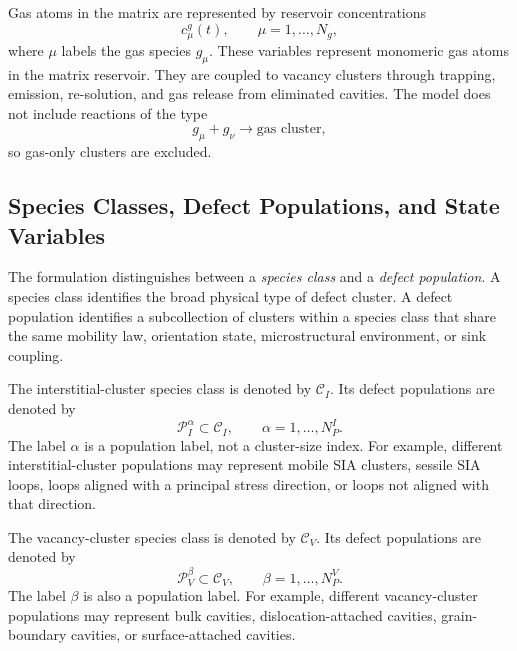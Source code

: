 Gas atoms in the matrix are represented by reservoir concentrations
\begin{equation}
    c^g_\mu(t),
    \qquad
    \mu=1,\ldots,N_g,
    \label{eq:gas_reservoir_concentration}
\end{equation}
where $\mu$ labels the gas species $g_\mu$. These variables represent
monomeric gas atoms in the matrix reservoir. They are coupled to vacancy
clusters through trapping, emission, re-solution, and gas release from
eliminated cavities. The model does not include reactions of the type
\begin{equation}
    g_\mu+g_\nu\longrightarrow \text{gas cluster},
\end{equation}
so gas-only clusters are excluded.

\subsection{Species Classes, Defect Populations, and State Variables}
\label{sec:species_classes_populations_state_variables}

The formulation distinguishes between a \emph{species class} and a
\emph{defect population}. A species class identifies the broad physical type of
defect cluster. A defect population identifies a subcollection of clusters
within a species class that share the same mobility law, orientation state,
microstructural environment, or sink coupling.

The interstitial-cluster species class is denoted by $\mathcal{C}_I$. Its
defect populations are denoted by
\begin{equation}
    \mathcal{P}_I^\alpha \subset \mathcal{C}_I,
    \qquad
    \alpha=1,\ldots,N_P^I .
\end{equation}
The label $\alpha$ is a population label, not a cluster-size index. For
example, different interstitial-cluster populations may represent mobile SIA
clusters, sessile SIA loops, loops aligned with a principal stress direction,
or loops not aligned with that direction.

The vacancy-cluster species class is denoted by $\mathcal{C}_V$. Its defect
populations are denoted by
\begin{equation}
    \mathcal{P}_V^\beta \subset \mathcal{C}_V,
    \qquad
    \beta=1,\ldots,N_P^V .
\end{equation}
The label $\beta$ is also a population label. For example, different
vacancy-cluster populations may represent bulk cavities, dislocation-attached
cavities, grain-boundary cavities, or surface-attached cavities.

